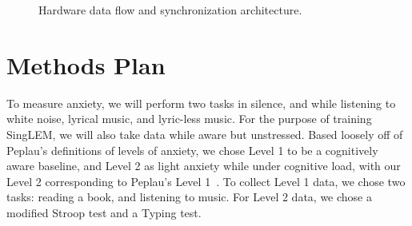 \documentclass[journal]{IEEEtran}
\begin{document}
\begin{figure}[htbp]
    \centering
    \caption{Hardware data flow and synchronization architecture.}
    \label{fig:data_flow}
\end{figure}

\section{Methods Plan}

To measure anxiety, we will perform two tasks in silence, and while listening to white noise, lyrical music, and lyric-less music. For the purpose of training SingLEM, we will also take data while aware but unstressed. Based loosely off of Peplau's definitions of levels of anxiety, we chose Level 1 to be a cognitively aware baseline, and Level 2 as light anxiety while under cognitive load, with our Level 2 corresponding to Peplau's Level 1~\cite{peplauInterpersonalRelationsNursing1952}. To collect Level 1 data, we chose two tasks: reading a book, and listening to music. For Level 2 data, we chose a modified Stroop test and a Typing test.
\end{document}
